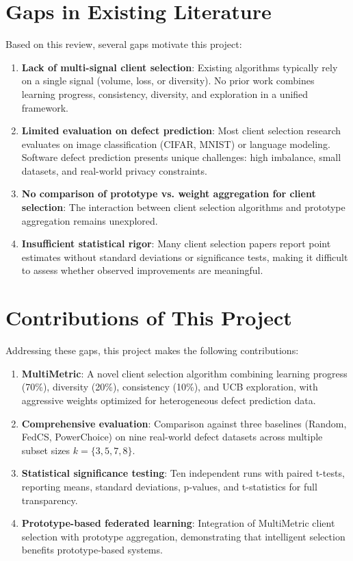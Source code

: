 \section{Gaps in Existing Literature}

Based on this review, several gaps motivate this project:

\begin{enumerate}
    \item \textbf{Lack of multi-signal client selection}: Existing algorithms typically rely on a single signal (volume, loss, or diversity). No prior work combines learning progress, consistency, diversity, and exploration in a unified framework.
    
    \item \textbf{Limited evaluation on defect prediction}: Most client selection research evaluates on image classification (CIFAR, MNIST) or language modeling. Software defect prediction presents unique challenges: high imbalance, small datasets, and real-world privacy constraints.
    
    \item \textbf{No comparison of prototype vs. weight aggregation for client selection}: The interaction between client selection algorithms and prototype aggregation remains unexplored.
    
    \item \textbf{Insufficient statistical rigor}: Many client selection papers report point estimates without standard deviations or significance tests, making it difficult to assess whether observed improvements are meaningful.
\end{enumerate}

\section{Contributions of This Project}

Addressing these gaps, this project makes the following contributions:

\begin{enumerate}
    \item \textbf{MultiMetric}: A novel client selection algorithm combining learning progress (70\%), diversity (20\%), consistency (10\%), and UCB exploration, with aggressive weights optimized for heterogeneous defect prediction data.
    
    \item \textbf{Comprehensive evaluation}: Comparison against three baselines (Random, FedCS, PowerChoice) on nine real-world defect datasets across multiple subset sizes \(k = \{3, 5, 7, 8\}\).
    
    \item \textbf{Statistical significance testing}: Ten independent runs with paired t-tests, reporting means, standard deviations, p-values, and t-statistics for full transparency.
    
    \item \textbf{Prototype-based federated learning}: Integration of MultiMetric client selection with prototype aggregation, demonstrating that intelligent selection benefits prototype-based systems.
\end{enumerate}

